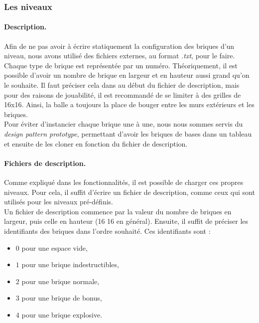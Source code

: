 \documentclass[a4paper,10pt]{article}
\begin{document}
    \subsubsection{Les niveaux}

        \paragraph{Description.} Afin de ne pas avoir à écrire statiquement la configuration des briques d'un niveau, nous avons
        utilisé des fichiers externes, au format \textit{.txt}, pour le faire. Chaque type de brique est représentée par un numéro.
        Théoriquement, il est possible d'avoir un nombre de brique en largeur et en hauteur aussi grand qu'on le souhaite.
        Il faut préciser cela dans au début du fichier de description, mais pour des raisons de jouabilité, il
        est recommandé de se limiter à des grilles de 16x16. Ainsi, la balle a toujours la place de bouger entre les murs
        extérieurs et les briques. \\

        Pour éviter d'instancier chaque brique une à une, nous nous sommes servis du \textit{design pattern prototype},
        permettant d'avoir les briques de bases dans un tableau et ensuite de les cloner en fonction du
        fichier de description.

        \paragraph{Fichiers de description.}
        Comme expliqué dans les fonctionnalités, il est possible de charger ces propres niveaux. Pour cela, il suffit
        d'écrire un fichier de description, comme ceux qui sont utilisés pour les niveaux pré-définis. \\
        Un fichier de description commence par la valeur du nombre de briques en largeur, puis celle en hauteur (16 16
        en général). Ensuite, il suffit de préciser les identifiants des briques dans l'ordre souhaité. Ces identifiants
        sont :
        \begin{itemize}
            \item $0$ pour une espace vide,
            \item $1$ pour une brique indestructibles,
            \item $2$ pour une brique normale,
            \item $3$ pour une brique de bonus,
            \item $4$ pour une brique explosive.
        \end{itemize}
\end{document}
